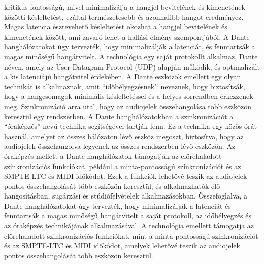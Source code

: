 kritikus fontosságú, mivel minimalizálja a hangjel bevitelének és kimenetének
közötti késleltetést, ezáltal természetesebb és azonnalibb hangot eredményez.
Magas latencia észrevehető késleltetést okozhat a hangjel bevitelének és
kimenetének között, ami zavaró lehet a hallási élmény szempontjából. A Dante
hanghálózatokat úgy tervezték, hogy minimalizálják a latenciát, és fenntartsák a
magas minőségű hangátvitelt. A technológia egy saját protokollt alkalmaz, Dante
néven, amely az User Datagram Protocol (UDP) alapján működik, és optimalizált a
kis latenciájú hangátvitel érdekében. A Dante eszközök emellett egy olyan
technikát is alkalmaznak, amit ``időbélyegzésnek'` neveznek, hogy biztosítsák,
hogy a hangcsomagok minimális késleltetéssel és a helyes sorrendben érkezzenek
meg. Szinkronizáció arra utal, hogy az audiojelek összehangolása több eszközön
keresztül egy rendszerben. A Dante hanghálózatokban a szinkronizációt a
``óraképzés'' nevű technika segítségével tartják fenn. Ez a technika egy közös
órát használ, amelyet az összes hálózaton lévő eszköz megoszt, biztosítva, hogy
az audiojelek összehangolva legyenek az összes rendszerben lévő eszközön. Az
óraképzés mellett a Dante hanghálózatok támogatják az előrehaladott
szinkronizációs funkciókat, például a minta-pontosságú szinkronizációt és az
SMPTE-LTC és MIDI időkódot. Ezek a funkciók lehetővé teszik az audiojelek pontos
összehangolását több eszközön keresztül, és alkalmazhatók élő hangosításban,
sugárzási és stúdiófelvételek alkalmazásokban. Összefoglalva, a Dante
hanghálózatokat úgy tervezték, hogy minimalizálják a latenciát és fenntartsák a
magas minőségű hangátvitelt a saját protokoll, az időbélyegzés és az óraképzés
technikájának alkalmazásával. A technológia emellett támogatja az előrehaladott
szinkronizációs funkciókat, mint a minta-pontosságú szinkronizációt és az
SMPTE-LTC és MIDI időkódot, amelyek lehetővé teszik az audiojelek pontos
összehangolását több eszközön keresztül.
